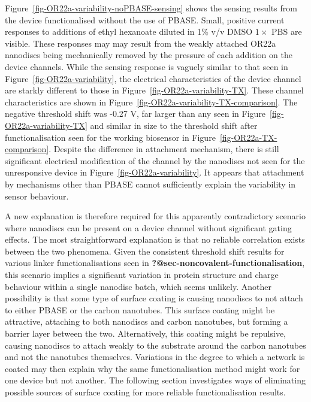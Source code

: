 \documentclass[
  a4paper,
]{scrbook}
\begin{document}
Figure~\ref{fig-OR22a-variability-noPBASE-sensing} shows the sensing
results from the device functionalised without the use of PBASE. Small,
positive current responses to additions of ethyl hexanoate diluted in
1\% v/v DMSO \(1 \times\) PBS are visible. These responses may may
result from the weakly attached OR22a nanodiscs being mechanically
removed by the pressure of each addition on the device channels. While
the sensing response is vaguely similar to that seen in
Figure~\ref{fig-OR22a-variability}, the electrical characteristics of
the device channel are starkly different to those in
Figure~\ref{fig-OR22a-variability-TX}. These channel characteristics are
shown in Figure~\ref{fig-OR22a-variability-TX-comparison}. The negative
threshold shift was -0.27 V, far larger than any seen in
Figure~\ref{fig-OR22a-variability-TX} and similar in size to the
threshold shift after functionalisation seen for the working biosensor
in Figure~\ref{fig-OR22a-TX-comparison}. Despite the difference in
attachment mechanism, there is still significant electrical modification
of the channel by the nanodiscs not seen for the unresponsive device in
Figure~\ref{fig-OR22a-variability}. It appears that attachment by
mechanisms other than PBASE cannot sufficiently explain the variability
in sensor behaviour.

A new explanation is therefore required for this apparently
contradictory scenario where nanodiscs can be present on a device
channel without significant gating effects. The most straightforward
explanation is that no reliable correlation exists between the two
phenomena. Given the consistent threshold shift results for various
linker functionalisations seen in
\textbf{?@sec-noncovalent-functionalisation}, this scenario implies a
significant variation in protein structure and charge behaviour within a
single nanodisc batch, which seems unlikely. Another possibility is that
some type of surface coating is causing nanodiscs to not attach to
either PBASE or the carbon nanotubes. This surface coating might be
attractive, attaching to both nanodiscs and carbon nanotubes, but
forming a barrier layer between the two. Alternatively, this coating
might be repulsive, causing nanodiscs to attach weakly to the substrate
around the carbon nanotubes and not the nanotubes themselves. Variations
in the degree to which a network is coated may then explain why the same
functionalisation method might work for one device but not another. The
following section investigates ways of eliminating possible sources of
surface coating for more reliable functionalisation results.
\end{document}
